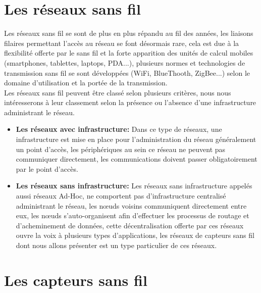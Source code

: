 \section{Les réseaux sans fil} 
 Les réseaux sans fil se sont de plus en plus répandu au fil des années, les liaisons filaires permettant l'accès au réseau se font désormais rare, cela est due à la flexibilité offerte par le sans fil et la forte apparition des  unités de calcul mobiles (smartphones, tablettes, laptops, PDA...), plusieurs normes et  technologies de transmission sans fil se sont développées (WiFi, BlueThooth, ZigBee...) selon le domaine d'utilisation et la portée de la transmission.\\
 Les réseaux sans fil peuvent être classé selon plusieurs critères, nous nous intéresserons à leur classement   selon la présence ou l'absence d'une infrastructure administrant le réseau.
\begin{itemize}
\item \textbf{Les réseaux avec infrastructure: }Dans ce type de réseaux, une infrastructure est mise en place pour l'administration du réseau généralement un point d'accès, les périphériques au sein ce réseau ne peuvent pas communiquer directement, les communications doivent passer obligatoirement par le point d'accès. 

\item \textbf{Les réseaux sans infrastructure: }Les réseaux sans infrastructure appelés aussi réseaux Ad-Hoc, ne comportent pas d'infrastructure centralisé administrant le réseau, les nœuds voisins communiquent directement entre eux, les nœuds s'auto-organisent afin d'effectuer les processus de routage et d'acheminement de données, cette décentralisation offerte par ces réseaux ouvre la voix à plusieurs types d'applications, les réseaux de capteurs sans fil dont nous allons présenter est un type particulier de ces réseaux.
\end{itemize}
\section{Les capteurs sans fil}
